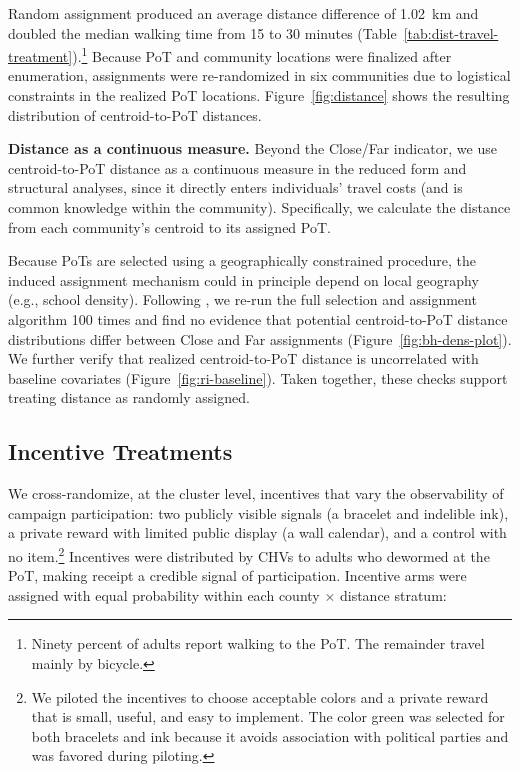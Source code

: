 \documentclass[12pt,a4paper]{article}
\begin{document}
Random assignment produced an average distance difference of 1.02~km and doubled the median walking time from 15 to 30 minutes (Table~\ref{tab:dist-travel-treatment}).\footnote{Ninety percent of adults report walking to the PoT. The remainder travel mainly by bicycle.} Because PoT and community locations were finalized after enumeration, assignments were re-randomized in six communities due to logistical constraints in the realized PoT locations.
Figure~\ref{fig:distance} shows the resulting distribution of centroid-to-PoT distances. 

\vspace{0.5em}
\textbf{Distance as a continuous measure.}
Beyond the Close/Far indicator, we use centroid-to-PoT distance as a continuous measure in the reduced form and structural
analyses, since it directly enters individuals' travel costs (and is common knowledge within the community). Specifically,
we calculate the distance from each community's centroid to its assigned PoT.

Because PoTs are selected using a geographically constrained procedure, the induced assignment mechanism could in principle
depend on local geography (e.g., school density). Following \citet{borusyak2023nonrandom}, we re-run the full selection and
assignment algorithm 100 times and find no evidence that potential centroid-to-PoT distance distributions differ between Close
and Far assignments (Figure~\ref{fig:bh-dens-plot}). We further verify that realized centroid-to-PoT distance is uncorrelated
with baseline covariates (Figure~\ref{fig:ri-baseline}). Taken together, these checks support treating distance as randomly assigned.

\subsection{Incentive Treatments}

We cross-randomize, at the cluster level, incentives that vary the observability of campaign participation:
two publicly visible signals (a bracelet and indelible ink), a private reward with limited public display (a wall calendar), and a control with no item.\footnote{We piloted the incentives to choose acceptable colors and a private reward that is small, useful, and easy to implement. The color green was selected for both bracelets and ink because it avoids association with political parties and was favored during piloting.} Incentives were distributed by CHVs to adults who dewormed at the PoT, making receipt a credible signal of participation. Incentive arms were assigned with equal probability within each county $\times$ distance stratum:
\end{document}
